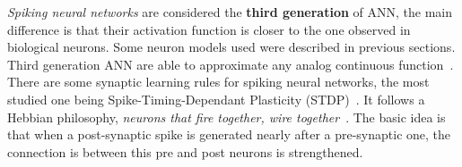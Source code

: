 \emph{Spiking neural networks} are considered the \textbf{third generation} of ANN, the main difference is that their activation function is closer to the one observed in biological neurons. Some neuron models used were described in previous sections. Third generation ANN are able to approximate any analog continuous function~\cite{third-gen-nn-Maass1997}. 
There are some synaptic learning rules for spiking neural networks, the most studied one being Spike-Timing-Dependant Plasticity (STDP)~\cite{STDP-Song2000}. 
It follows a Hebbian philosophy, \emph{neurons that fire together, wire together}~\cite{hebb2005organization}. The basic idea is that when a post-synaptic spike is generated nearly after a pre-synaptic one, the connection is between this pre and post neurons is strengthened.\\

